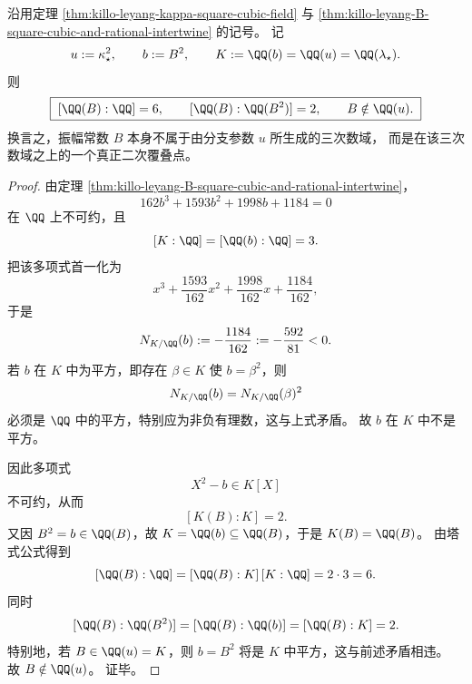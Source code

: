 \begin{theorem}\label{thm:xi-leyang-amplitude-B-true-quadratic-cover}
沿用定理 \ref{thm:killo-leyang-kappa-square-cubic-field} 与
\ref{thm:killo-leyang-B-square-cubic-and-rational-intertwine} 的记号。
记
\[
u:=\kappa_\star^2,
\qquad
b:=B^2,
\qquad
K:=\QQ(b)=\QQ(u)=\QQ(\lambda_\star).
\]
则
\[
\boxed{\;
[\QQ(B):\QQ]=6,
\qquad
[\QQ(B):\QQ(B^2)]=2,
\qquad
B\notin \QQ(u).\;}
\]
换言之，振幅常数 \(B\) 本身不属于由分支参数 \(u\) 所生成的三次数域，
而是在该三次数域之上的一个真正二次覆叠点。
\end{theorem}
\begin{proof}
由定理 \ref{thm:killo-leyang-B-square-cubic-and-rational-intertwine}，
\[
162b^3+1593b^2+1998b+1184=0
\]
在 \(\QQ\) 上不可约，且
\[
[K:\QQ]=[\QQ(b):\QQ]=3.
\]
把该多项式首一化为
\[
x^3+\frac{1593}{162}x^2+\frac{1998}{162}x+\frac{1184}{162},
\]
于是
\[
N_{K/\QQ}(b)
:=
-\frac{1184}{162}
:=
-\frac{592}{81}<0.
\]
若 \(b\) 在 \(K\) 中为平方，即存在 \(\beta\in K\) 使
\(
b=\beta^2
\)，则
\[
N_{K/\QQ}(b)=N_{K/\QQ}(\beta)^2
\]
必须是 \(\QQ\) 中的平方，特别应为非负有理数，这与上式矛盾。
故 \(b\) 在 \(K\) 中不是平方。
\par
因此多项式
\[
X^2-b\in K[X]
\]
不可约，从而
\[
[K(B):K]=2.
\]
又因 \(B^2=b\in \QQ(B)\)，故
\(
K=\QQ(b)\subseteq \QQ(B)
\)，于是 \(K(B)=\QQ(B)\)。
由塔式公式得到
\[
[\QQ(B):\QQ]=[\QQ(B):K]\,[K:\QQ]=2\cdot 3=6.
\]
同时
\[
[\QQ(B):\QQ(B^2)]=[\QQ(B):\QQ(b)]=[\QQ(B):K]=2.
\]
特别地，若 \(B\in \QQ(u)=K\)，则 \(b=B^2\) 将是 \(K\) 中平方，这与前述矛盾相违。
故 \(B\notin \QQ(u)\)。
证毕。
\end{proof}

